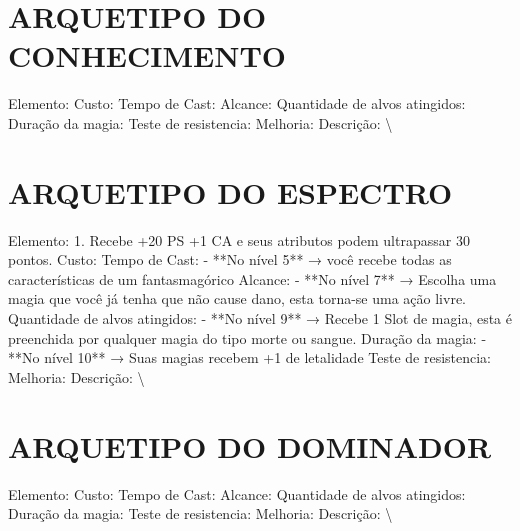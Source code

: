 \documentclass{article}%
\begin{document}
%
\section{ARQUETIPO DO CONHECIMENTO}%
\label{sec:ARQUETIPODOCONHECIMENTO}%
Elemento: \newline%
Custo: \newline%
Tempo de Cast: \newline%
Alcance: \newline%
Quantidade de alvos atingidos: \newline%
Duração da magia: \newline%
Teste de resistencia: \newline%
Melhoria: \newline%
Descrição: \textbackslash{}

%
\section{ARQUETIPO DO ESPECTRO}%
\label{sec:ARQUETIPODOESPECTRO}%
Elemento: 1. Recebe +20 PS +1 CA e seus atributos podem ultrapassar 30 pontos.\newline%
Custo: \newline%
Tempo de Cast: {-} **No nível 5** → você recebe todas as características de um fantasmagórico\newline%
Alcance: {-} **No nível 7** → Escolha uma magia que você já tenha que não cause dano, esta torna{-}se uma ação livre.\newline%
Quantidade de alvos atingidos: {-} **No nível 9** → Recebe 1 Slot de magia, esta é preenchida por qualquer magia do tipo morte ou sangue.\newline%
Duração da magia: {-} **No nível 10** → Suas magias recebem +1 de letalidade\newline%
Teste de resistencia: \newline%
Melhoria: \newline%
Descrição: \textbackslash{}

%
\section{ARQUETIPO DO DOMINADOR}%
\label{sec:ARQUETIPODODOMINADOR}%
Elemento: \newline%
Custo: \newline%
Tempo de Cast: \newline%
Alcance: \newline%
Quantidade de alvos atingidos: \newline%
Duração da magia: \newline%
Teste de resistencia: \newline%
Melhoria: \newline%
Descrição: \textbackslash{}
\end{document}
